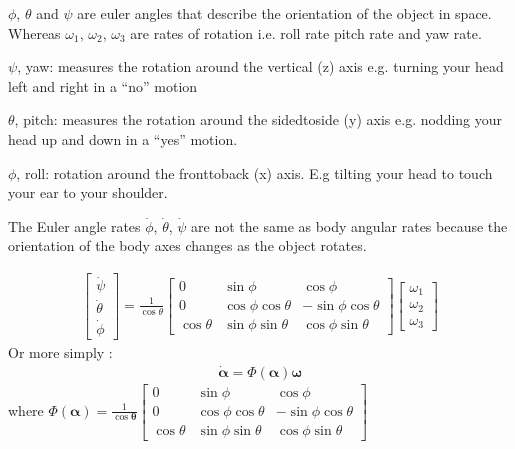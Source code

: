 \documentclass[letterpaper,10pt,english]{jupyterBook}
\begin{document}
\begin{sphinxShadowBox}
\sphinxstylesidebartitle{}

\sphinxAtStartPar
\(\phi\), \(\theta\) and \(\psi\) are euler angles that describe the orientation of the object in space. Whereas \(\omega_1\), \(\omega_2\), \(\omega_3\)  are rates of rotation i.e. roll rate pitch rate and yaw rate.

\sphinxAtStartPar
\(\psi\), yaw: measures the rotation around the vertical (z) axis e.g. turning your head left and right in a “no” motion

\sphinxAtStartPar
\(\theta\), pitch: measures the rotation around the sided\sphinxhyphen{}to\sphinxhyphen{}side (y) axis e.g. nodding your head up and down in a “yes” motion.

\sphinxAtStartPar
\(\phi\), roll: rotation around the front\sphinxhyphen{}to\sphinxhyphen{}back (x) axis. E.g tilting your head to touch your ear to your shoulder.

\sphinxAtStartPar
The Euler angle rates \(\dot{\phi}\), \(\dot{\theta}\), \(\dot{\psi}\) are not the same as body angular rates because the orientation of the body axes changes as the object rotates.
\end{sphinxShadowBox}
\begin{equation}\label{equation:5IMU:H}
\begin{split}\begin{bmatrix}
\dot{\psi} \\
\dot{\theta} \\
\dot{\phi}
\end{bmatrix} =
\frac{1}{\cos{\theta}}\begin{bmatrix}
0 & \sin\phi  & \cos\phi  \\
0 & \cos\phi\cos\theta & -\sin\phi\cos\theta \\
\cos\theta & \sin\phi\sin\theta & \cos\phi  \sin\theta
\end{bmatrix}
\begin{bmatrix}
\omega_1 \\
\omega_2 \\
\omega_3
\end{bmatrix}\end{split}
\end{equation}
\sphinxAtStartPar
Or more simply :
\begin{equation}\label{equation:5IMU:eq-simple}
\begin{split}\dot{\boldsymbol{\alpha}} = \Phi(\boldsymbol{\alpha}) {\boldsymbol{\omega}}\end{split}
\end{equation}
\sphinxAtStartPar
where \(\Phi(\boldsymbol{\alpha}) = \frac{1}{\cos{\boldsymbol{\theta}}}\begin{bmatrix}
0 & \sin\phi  & \cos\phi  \\
0 & \cos\phi\cos\theta & -\sin\phi\cos\theta \\
\cos\theta & \sin\phi\sin\theta & \cos\phi  \sin\theta
\end{bmatrix}\)
\end{document}
